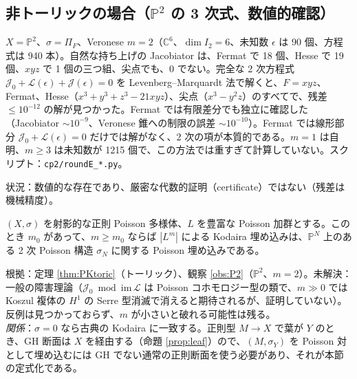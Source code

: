 \subsection{非トーリックの場合（$\mathbb P^2$ の 3 次式、数値的確認）}
\begin{obs}\tV\label{obs:P2}
$X=\mathbb P^2$、$\sigma=\Pi_F$、Veronese $m=2$（$\mathbb C^6$、$\dim I_2=6$、未知数 $\epsilon$ は 90 個、方程式は 940 本）。自然な持ち上げの Jacobiator は、Fermat で 18 個、Hesse で 19 個、$xyz$ で 1 個の三つ組、尖点でも、0 でない。完全な 2 次方程式 $\mathcal J_0+\mathcal L(\epsilon)+\mathcal J(\epsilon)=0$ を Levenberg--Marquardt 法で解くと、$F=xyz$、Fermat、Hesse（$x^3+y^3+z^3-21xyz$）、尖点（$x^3-y^2z$）のすべてで、残差 $\le10^{-12}$ の解が見つかった。Fermat では有限差分でも独立に確認した（Jacobiator $\sim10^{-9}$、Veronese 錐への制限の誤差 $\sim10^{-10}$）。Fermat では線形部分 $\mathcal J_0+\mathcal L(\epsilon)=0$ だけでは解がなく、2 次の項が本質的である。$m=1$ は自明、$m\ge3$ は未知数が 1215 個で、この方法では重すぎて計算していない。スクリプト：\texttt{cp2/roundE\_*.py}。
\end{obs}
\noindent 状況：数値的な存在であり、厳密な代数的証明（certificate）ではない（残差は機械精度）。

\begin{conj}\tK\label{conj:PK}
$(X,\sigma)$ を射影的な正則 Poisson 多様体、$L$ を豊富な Poisson 加群とする。このとき $m_0$ があって、$m\ge m_0$ ならば $|L^m|$ による Kodaira 埋め込みは、$\mathbb P^N$ 上のある 2 次 Poisson 構造 $\sigma_N$ に関する Poisson 埋め込みである。
\end{conj}
\noindent 根拠：定理 \ref{thm:PKtoric}（トーリック）、観察 \ref{obs:P2}（$\mathbb P^2$、$m=2$）。未解決：一般の障害理論（$\mathcal J_0\bmod\mathrm{im}\,\mathcal L$ は Poisson コホモロジー型の類で、$m\gg0$ では Koszul 複体の $H^1$ の Serre 型消滅で消えると期待されるが、証明していない）。反例は見つかっておらず、$m$ が小さいと破れる可能性は残る。\\
\emph{関係}：$\sigma=0$ なら古典の Kodaira に一致する。正則型 $M\to X$ で葉が $Y$ のとき、GH 断面は $X$ を経由する（命題 \ref{prop:leaf}）ので、$(M,\sigma_Y)$ を Poisson 対として埋め込むには GH でない通常の正則断面を使う必要があり、それが本節の定式化である。

